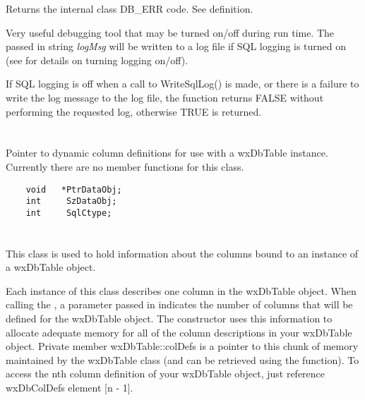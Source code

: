 Returns the internal class DB_ERR code.  See  definition.


\label{wxdbwritesqllog}





Very useful debugging tool that may be turned on/off during run time.  The
passed in string {\it logMsg} will be written to a log file if SQL logging
is turned on (see  for details on turning logging on/off).


If SQL logging is off when a call to WriteSqlLog() is made, or there is a
failure to write the log message to the log file, the function returns
FALSE without performing the requested log, otherwise TRUE is returned.




\section{}\label{wxdbcoldataptr}

Pointer to dynamic column definitions for use with a wxDbTable instance.  
Currently there are no member functions for this class.

\begin{verbatim}
    void   *PtrDataObj;
    int     SzDataObj;
    int     SqlCtype;
\end{verbatim}


\section{}\label{wxdbcoldef}

This class is used to hold information about the columns bound to an 
instance of a wxDbTable object.  

Each instance of this class describes one column in the wxDbTable 
object.  When calling the , a 
parameter passed in indicates the number of columns that will be defined for 
the wxDbTable object.  The constructor uses this information to allocate 
adequate memory for all of the column descriptions in your wxDbTable object.  
Private member wxDbTable::colDefs is a pointer to this chunk of memory 
maintained by the wxDbTable class (and can be retrieved using the 
 function).  
To access the nth column definition of your wxDbTable object, just reference 
wxDbColDefs element [n - 1].


